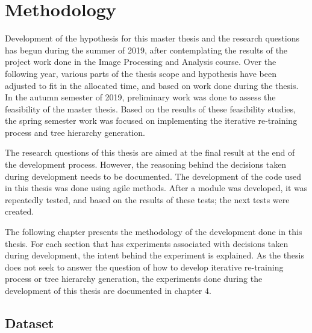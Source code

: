 \chapter{Methodology}

Development of the hypothesis for this master thesis and the research questions has begun during the summer of 2019, after contemplating the results of the project work done in the Image Processing and Analysis course.
Over the following year, various parts of the thesis scope and hypothesis have been adjusted to fit in the allocated time, and based on work done during the thesis.
In the autumn semester of 2019, preliminary work was done to assess the feasibility of the master thesis.
Based on the results of these feasibility studies, the spring semester work was focused on implementing the iterative re-training process and tree hierarchy generation.

The research questions of this thesis are aimed at the final result at the end of the development process. 
However, the reasoning behind the decisions taken during development needs to be documented.
The development of the code used in this thesis was done using agile methods.
After a module was developed, it was repeatedly tested, and based on the results of these tests; the next tests were created.

The following chapter presents the methodology of the development done in this thesis.
For each section that has experiments associated with decisions taken during development, the intent behind the experiment is explained.
As the thesis does not seek to answer the question of how to develop iterative re-training process or tree hierarchy generation, the experiments done during the development of this thesis are documented in chapter 4.

\section{Dataset}



